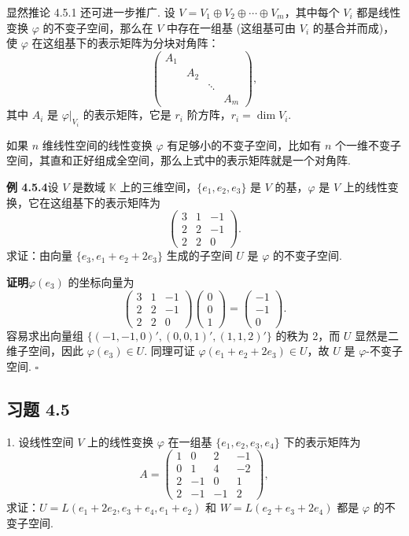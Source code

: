 \documentclass[UTF8,12pt,a4paper,fontset=fandol]{ctexart}
\begin{document}
显然推论 4.5.1 还可进一步推广. 设 $V=V_1\oplus V_2\oplus\cdots\oplus V_m$，其中每个 $V_i$ 都是线性变换 $\varphi$ 的不变子空间，那么在 $V$ 中存在一组基 (这组基可由 $V_i$ 的基合并而成)，使 $\varphi$ 在这组基下的表示矩阵为分块对角阵：
\[
\left(\begin{array}{cccc}
A_1 & & &\\
& A_2 & &\\
& & \ddots &\\
& & & A_m
\end{array}\right),
\]
其中 $A_i$ 是 $\varphi|_{V_i}$ 的表示矩阵，它是 $r_i$ 阶方阵，$r_i=\dim V_i$.

如果 $n$ 维线性空间的线性变换 $\varphi$ 有足够小的不变子空间，比如有 $n$ 个一维不变子空间，其直和正好组成全空间，那么上式中的表示矩阵就是一个对角阵.

\noindent\textbf{例 4.5.4}\quad 设 $V$ 是数域 $\mathbb{K}$ 上的三维空间，$\{e_1,e_2,e_3\}$ 是 $V$ 的基，$\varphi$ 是 $V$ 上的线性变换，它在这组基下的表示矩阵为
\[
\left(\begin{array}{rrr}
3 & 1 & -1\\
2 & 2 & -1\\
2 & 2 & 0
\end{array}\right).
\]
求证：由向量 $\{e_3,e_1+e_2+2e_3\}$ 生成的子空间 $U$ 是 $\varphi$ 的不变子空间.

\noindent\textbf{证明}\quad $\varphi(e_3)$ 的坐标向量为
\[
\left(\begin{array}{rrr}
3 & 1 & -1\\
2 & 2 & -1\\
2 & 2 & 0
\end{array}\right)
\left(\begin{array}{c}
0\\
0\\
1
\end{array}\right)
=
\left(\begin{array}{r}
-1\\
-1\\
0
\end{array}\right).
\]
容易求出向量组 $\{(-1,-1,0)',(0,0,1)',(1,1,2)'\}$ 的秩为 2，而 $U$ 显然是二维子空间，因此 $\varphi(e_3)\in U$. 同理可证 $\varphi(e_1+e_2+2e_3)\in U$，故 $U$ 是 $\varphi$-不变子空间. $\square$

\subsection*{习题 4.5}

1. 设线性空间 $V$ 上的线性变换 $\varphi$ 在一组基 $\{e_1,e_2,e_3,e_4\}$ 下的表示矩阵为
\[
A=
\left(\begin{array}{rrrr}
1 & 0 & 2 & -1\\
0 & 1 & 4 & -2\\
2 & -1 & 0 & 1\\
2 & -1 & -1 & 2
\end{array}\right),
\]
求证：$U=L(e_1+2e_2,e_3+e_4,e_1+e_2)$ 和 $W=L(e_2+e_3+2e_4)$ 都是 $\varphi$ 的不变子空间.
\end{document}
